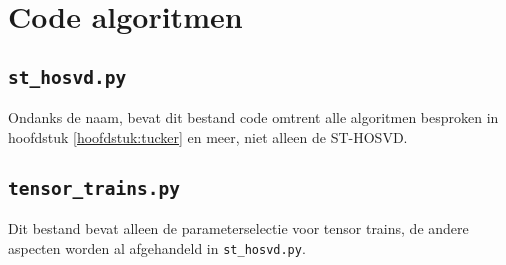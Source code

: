 \chapter{Code algoritmen}
\label{app:algoritmen}

\section{\texttt{st\_hosvd.py}}

Ondanks de naam, bevat dit bestand code omtrent alle algoritmen besproken in hoofdstuk \ref{hoofdstuk:tucker} en meer, niet alleen de ST-HOSVD.\\



\section{\texttt{tensor\_trains.py}}

Dit bestand bevat alleen de parameterselectie voor tensor trains, de andere aspecten worden al afgehandeld in \texttt{st\_hosvd.py}.\\

